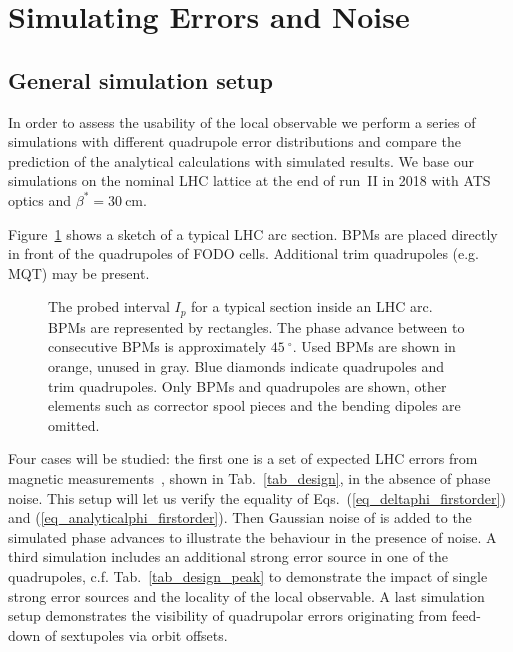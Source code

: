 
\section{Simulating Errors and Noise}
\label{sec_lobster}
\label{sec:robustness_check}

\subsection{General simulation setup}

In order to assess the usability of the local observable we perform a series of simulations with different
quadrupole error distributions and compare the prediction of the analytical calculations with simulated results. 
We base our simulations on the nominal LHC lattice at the end of run~II in 2018 with ATS optics and 
$\beta^*=\SI{30}{\centi\metre}$.

Figure~\ref{fig_combination} shows a sketch of a typical LHC arc section. BPMs are placed directly in
front of the quadrupoles of FODO cells. Additional trim quadrupoles (e.g. MQT) may be present.
%
\begin{figure}[htbp]
  \centering
  
  \caption{The probed interval $I_p$ for a typical section inside an LHC arc.
    BPMs are represented by rectangles.
    The phase advance between to consecutive BPMs is approximately $\SI{45}{^\circ}$.
    Used BPMs are shown in orange, unused in gray.
    Blue diamonds indicate quadrupoles and trim quadrupoles.
    Only BPMs and quadrupoles are shown, other elements such as corrector spool pieces and the
    bending dipoles are omitted.
  }
  \label{fig_combination}
\end{figure}
%
%
Four cases will be studied: the first one is a set of expected LHC
errors from magnetic measurements~\cite{wise1,wise2}, shown in Tab.~\ref{tab_design}, in the absence of phase noise.
This setup will let us verify the equality of Eqs.~(\ref{eq_deltaphi_firstorder}) and (\ref{eq_analyticalphi_firstorder}).
Then Gaussian noise of \noiserms{} is added to the simulated phase advances to illustrate the behaviour
in the presence of noise.
A third simulation includes an additional strong error source in one of the quadrupoles, c.f. Tab.~\ref{tab_design_peak}
to demonstrate the impact of single strong error sources and the locality of the local observable.
A last simulation setup demonstrates the visibility of quadrupolar errors originating from feed-down
of sextupoles via orbit offsets.

